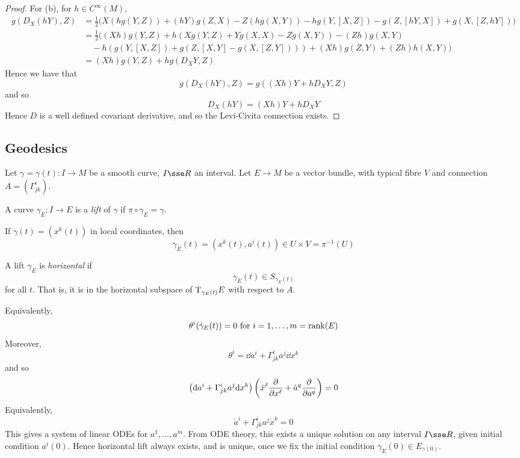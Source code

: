 \documentclass{article}
\begin{document}
\begin{proof}
    For (b), for \(h \in C^\infty(M)\),
    \begin{align*}
        g(D_X(hY), Z) &= \frac{1}{2}\big(X(hg(Y, Z)) + (hY)g(Z, X) - Z(hg(X, Y)) - hg(Y, [X, Z]) - g(Z, [hY, X]) + g(X, [Z, hY])\big) \\
        &= \frac{1}{2}\big((Xh)g(Y, Z) + h(Xg(Y, Z) + Yg(X, X) - Zg(X, Y)) - (Zh)g(X, Y)\\
        &\quad-h(g(Y, [X, Z]) + g(Z, [X, Y] - g(X, [Z, Y]))) + (Xh)g(Z, Y) + (Zh)h(X, Y)\big) \\
        &= (Xh)g(Y, Z) + hg(D_XY, Z)
    \end{align*}
    Hence we have that
    \[g(D_X(hY), Z) = g((Xh)Y + hD_XY, Z)\]
    and so
    \[D_X(hY) = (Xh)Y + hD_XY\]
    Hence \(D\) is a well defined covariant derivative, and so the Levi-Civita connection exists.
\end{proof}

\subsection{Geodesics}

Let \(\gamma = \gamma(t) : I \to M\) be a smooth curve, \(I \sse R\) an interval. Let \(E \to M\) be a vector bundle, with typical fibre \(V\) and connection \(A = (\Gamma^i_{jk})\).
\begin{definition}
    [lift] A curve \(\gamma_E : I \to E\) is a \emph{lift} of \(\gamma\) if \(\pi \circ \gamma_E = \gamma\).
\end{definition}
If \(\gamma(t) = (x^k(t))\) in local coordinates, then
\[\gamma_E(t) = (x^k(t), a^i(t)) \in U \times V = \pi^{-1}(U)\]
\begin{definition}
     A lift \(\gamma_E\) is \emph{horizontal} if
    \[\dot \gamma_E(t) \in S_{\gamma_E(t)}\]
    for all \(t\). That is, it is in the horizontal subspace of \(\mathrm{T}_{\gamma_E(t)}E\) with respect to \(A\).
\end{definition}
Equivalently,
\[\theta^i(\dot\gamma_E(t)) = 0 \text{ for }i = 1, \dots, m = \rank(E)\]
Moreover,
\[\theta^i = \dd a^i + \Gamma^i_{jk}a^j \dd x^k\]
and so
\[\left(\dd a^i + \Gamma^i_{jk}a^j\dd x^k\right)\left(\dot x^\ell \pdv{x^\ell} + \dot a^q\pdv{a^q}\right) = 0\]
Equivalently,
\[\dot a^i + \Gamma^i_{jk}a^j\dot x^k = 0\]
This gives a system of linear ODEs for \(a^1, \dots, a^m\). From ODE theory, this exists a unique solution on any interval \(I \sse R\), given initial condition \(a^i(0)\). Hence horizontal lift always exists, and is unique, once we fix the initial condition \(\gamma_E(0) \in E_{\gamma(0)}\).
\end{document}
